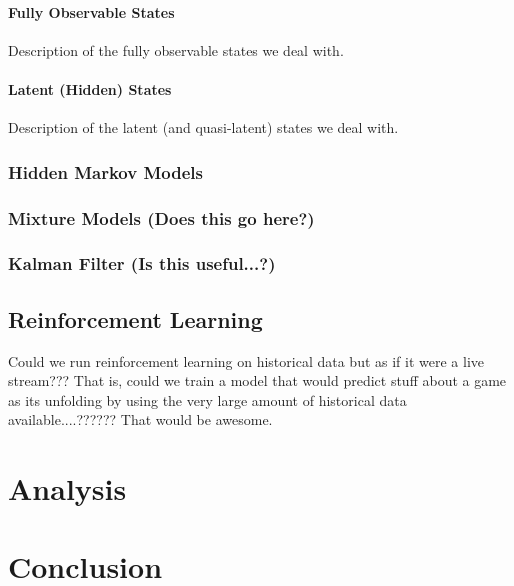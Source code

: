 \documentclass{notes}
\begin{document}
          \paragraph{Fully Observable States}
            Description of the fully observable states we deal with.

          \paragraph{Latent (Hidden) States}
            Description of the latent (and quasi-latent) states we deal with.


        \subsubsection{Hidden Markov Models}


        \subsubsection{Mixture Models (Does this go here?)}


        \subsubsection{Kalman Filter (Is this useful...?)}


    \subsection{Reinforcement Learning}
      Could we run reinforcement learning on historical data but as if it were a live stream???
      That is, could we train a model that would predict stuff about a game as its unfolding by using the very large amount of historical data available....??????
      That would be awesome.


  \section{Analysis}


  \section{Conclusion}

  \pagebreak
  \renewcommand{\thesection}{\Alph{section}}
  \renewcommand{\thesubsection}{\Alph{section}.\arabic{subsection}}
  \renewcommand{\thesubsubsection}{\Alph{section}.\arabic{subsection}.\arabic{subsubsection}}
  \setcounter{section}{0}
\end{document}
